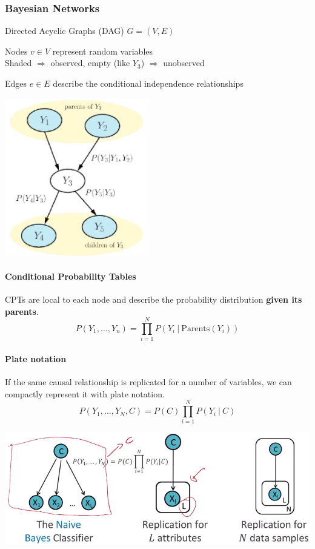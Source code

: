 \documentclass[10pt]{report}
\begin{document}
\subsubsection{Bayesian Networks} 
\begin{multicols}{2}
Directed Acyclic Graphs (DAG) $G = (V,E)$\begin{list}{}{}
	\item Nodes $v\in V$ represent random variables\\
	Shaded $\Rightarrow$ observed, empty (like $Y_3$) $\Rightarrow$ unobserved
	\item Edges $e\in E$ describe the conditional independence relationships
\end{list}
\columnbreak
\begin{center}
	\includegraphics[scale=0.5]{15.png}
\end{center}
\end{multicols}
\paragraph{Conditional Probability Tables} CPTs are local to each node and describe the probability distribution \textbf{given its parents}.
$$P(Y_1,\ldots,Y_n) = \prod_{i=1}^N P(Y_i\:|\:\text{Parents}(Y_i))$$
\paragraph{Plate notation} If the same causal relationship is replicated for a number of variables, we can compactly represent it with plate notation.
$$P(Y_1,\ldots,Y_N,C) = P(C)\prod_{i=1}^N P(Y_i\:|\:C)$$
\begin{center}
	\includegraphics[scale=0.5]{16.png}
\end{center}
\end{document}
